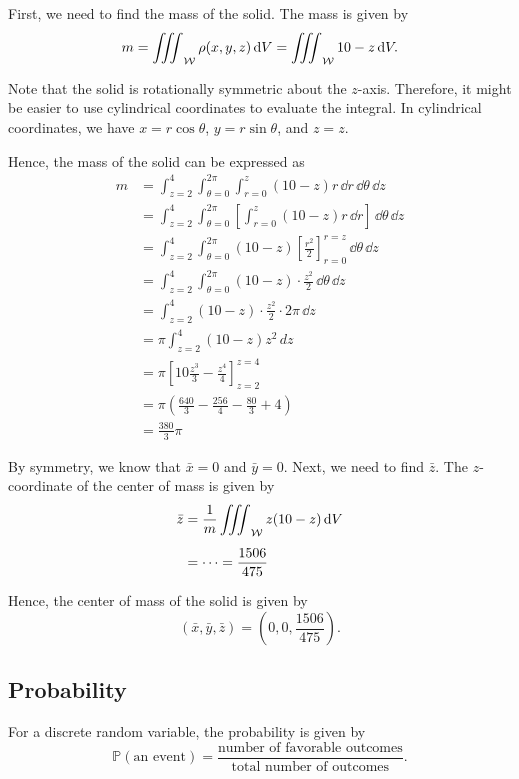\begin{sol}
First, we need to find the mass of the solid. The mass is given by
\[
    m = \wiiint{\rho(x, y, z)} = \wiiint{10 - z}.
\]

Note that the solid is rotationally symmetric about the $z$-axis. 
Therefore, it might be easier to use cylindrical coordinates to evaluate the integral.
In cylindrical coordinates, we have $x = r\cos\theta$, $y = r\sin\theta$, and $z = z$.

Hence, the mass of the solid can be expressed as
\begin{align*}
    m &= \int_{z = 2}^{4}\int_{\theta = 0}^{2\pi}\int_{r = 0}^{z} (10 - z) r \, \dd{r} \, \dd{\theta} \, \dd{z} \\[0.5em]
    &= \int_{z = 2}^{4}\int_{\theta = 0}^{2\pi} \left[ \int_{r = 0}^{z} (10 - z) r \, \dd{r} \right] \, \dd{\theta} \, \dd{z} \\[0.5em]
    &= \int_{z = 2}^{4}\int_{\theta = 0}^{2\pi} (10 - z) \left[ \frac{r^2}{2} \right]_{r = 0}^{r = z} \, \dd{\theta} \, \dd{z} \\[0.5em]
    &= \int_{z = 2}^{4}\int_{\theta = 0}^{2\pi} (10 - z) \cdot \frac{z^2}{2} \, \dd{\theta} \, \dd{z} \\[0.5em]
    &= \int_{z = 2}^{4} (10 - z) \cdot \frac{z^2}{2} \cdot 2\pi \, \dd{z} \\[0.5em]
    &= \pi\int_{z = 2}^{4}(10 - z) z^2\, dz \\[0.5em]
    &= \pi\left[10\frac{z^3}{3}-\frac{z^4}{4}\right]_{z = 2}^{z = 4} \\[0.5em]
    &= \pi\left(\frac{640}{3}-\frac{256}{4}-\frac{80}{3}+4\right) \\[0.5em]
    &= \frac{380}{3}\pi
\end{align*}

By symmetry, we know that $\bar{x} = 0$ and $\bar{y} = 0$.
Next, we need to find $\bar{z}$.
The $z$-coordinate of the center of mass is given by
\begin{align*}
    \bar{z} &= \frac{1}{m} \mathop{\int\mkern-10mu\int\mkern-10mu\int}\nolimits_{\mathcal{W}} z (10 - z) \, \mathrm{d}V \\[0.5em]
    &= \dots = \frac{1506}{475}
\end{align*}

Hence, the center of mass of the solid is given by
\[
    (\bar{x}, \bar{y}, \bar{z}) = \left(0, 0, \frac{1506}{475}\right).
\]
\end{sol}


\subsection{Probability}
For a discrete random variable, the probability is given by
\[
    \mathbb{P}(\text{an event}) = \frac{\text{number of favorable outcomes}}{\text{total number of outcomes}}.
\]

